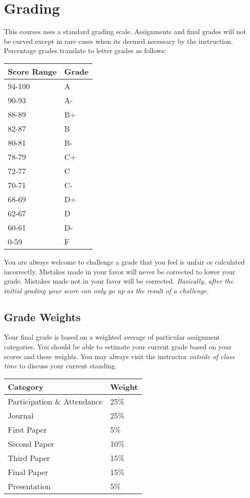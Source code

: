 \documentclass[]{tufte-handout}
\begin{document}
\section{Grading}

This courses uses a standard grading scale.  Assignments and final grades will not be curved except in rare cases when its deemed necessary by the instruction.  Percentage grades translate to letter grades as follows:
\newline
\begin{center}
\begin{small}
\begin{tabular}{ll}
Score Range & Grade \\ \hline
94-100 & A \\
90-93 & A- \\
88-89 & B+ \\
82-87 & B \\
80-81 & B- \\
78-79 & C+ \\
72-77 & C \\
70-71 & C- \\
68-69 & D+ \\
62-67 & D \\
60-61 & D- \\
0-59 & F 
\end{tabular}
\end{small}
\end{center}


You are always welcome to challenge a grade that you feel is unfair or calculated incorrectly.  Mistakes made in your favor will never be corrected to lower your grade.  Mistakes made not in your favor will be corrected.  \textit{Basically, after the initial grading your score can only go up as the result of a challenge.}


\subsection{Grade Weights}

Your final grade is based on a weighted average of particular assignment categories.  You should be able to estimate your current grade based on your scores and these weights.  You may always visit the instructor \textit{outside of class time} to discuss your current standing.  

\begin{center}
\begin{tabular}{ll}
Category & Weight  \\ \hline
Participation \& Attendance & 25\% \\
Journal & 25\% \\
First Paper & 5\% \\
Second Paper & 10\% \\
Third Paper & 15\% \\
Final Paper & 15\% \\
Presentation & 5\% \\

\end{tabular}
\end{center}
\end{document}
